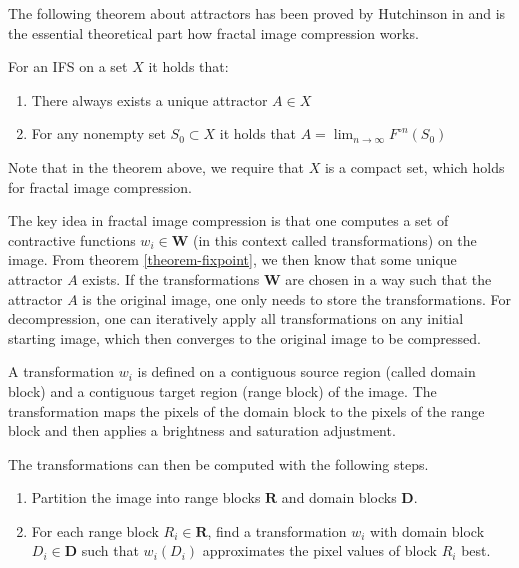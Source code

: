 The following theorem about attractors has been proved by Hutchinson in
\cite{hutchinson1981fractals} and is the essential theoretical part how fractal
image compression works.

\begin{theorem}\label{theorem-fixpoint}
    For an IFS on a set $X$ it holds that:
    \begin{enumerate}
        \item There always exists a unique attractor $A \in X$
        \item For any nonempty set $S_0 \subset X$ it holds that $A = \lim_{n \to \infty} F^{\circ n}(S_0)$
    \end{enumerate}
\end{theorem}

Note that in the theorem above, we require that $X$ is a compact set, which
holds for fractal image compression.

 The key idea in fractal image compression
is that one computes a set of contractive functions $w_i \in \boldsymbol{W}$ (in
this context called transformations) on the image. From theorem
\ref{theorem-fixpoint}, we then know that some unique attractor $A$ exists. If
the transformations $\boldsymbol{W}$ are chosen in a way such that the attractor
$A$ is the original image, one only needs to store the transformations. For
decompression, one can iteratively apply all transformations on any initial
starting image, which then converges to the original image to be compressed.

A transformation $w_i$ is defined on a contiguous source region (called domain
block) and a contiguous target region (range block) of the image. The
transformation maps the pixels of the domain block to the pixels of the range
block and then applies a brightness and saturation adjustment.

The transformations can then be computed with the following steps.

\begin{enumerate}
  \item Partition the image into range blocks $\boldsymbol{R}$ and domain blocks
    $\boldsymbol{D}$.
  \item For each range block $R_i \in \boldsymbol{R}$, find a transformation
    $w_i$ with domain block $D_i \in \boldsymbol{D}$ such that $w_i(D_i)$
    approximates the pixel values of block $R_i$ best.
\end{enumerate}

